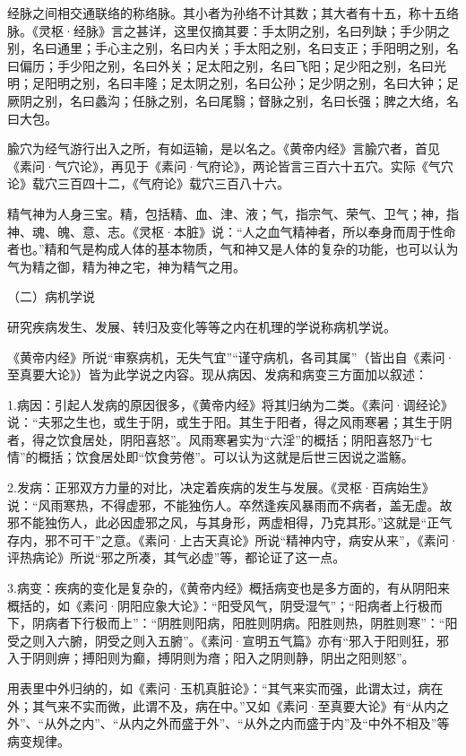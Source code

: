 \documentclass[a4paper,12pt,UTF8,twoside]{ctexbook}
\begin{document}
	经脉之间相交通联络的称络脉。其小者为孙络不计其数；其大者有十五，称十五络脉。《灵枢·经脉》言之甚详，这里仅摘其要：手太阴之别，名曰列缺；手少阴之别，名曰通里；手心主之别，名曰内关；手太阳之别，名曰支正；手阳明之别，名曰偏历；手少阳之别，名曰外关；足太阳之别，名曰飞阳；足少阳之别，名曰光明；足阳明之别，名曰丰隆；足太阴之别，名曰公孙；足少阴之别，名曰大钟；足厥阴之别，名曰蠡沟；任脉之别，名曰尾翳；督脉之别，名曰长强；脾之大络，名曰大包。
	
	腧穴为经气游行出入之所，有如运输，是以名之。《黄帝内经》言腧穴者，首见《素问·气穴论》，再见于《素问·气府论》，两论皆言三百六十五穴。实际《气穴论》载穴三百四十二，《气府论》载穴三百八十六。
	
	精气神为人身三宝。精，包括精、血、津、液；气，指宗气、荣气、卫气；神，指神、魂、魄、意、志。《灵枢·本脏》说：“人之血气精神者，所以奉身而周于性命者也。”精和气是构成人体的基本物质，气和神又是人体的复杂的功能，也可以认为气为精之御，精为神之宅，神为精气之用。
	
	（二）病机学说
	
	研究疾病发生、发展、转归及变化等等之内在机理的学说称病机学说。
	
	《黄帝内经》所说“审察病机，无失气宜”“谨守病机，各司其属”（皆出自《素问·至真要大论》）皆为此学说之内容。现从病因、发病和病变三方面加以叙述：
	
	1.病因：引起人发病的原因很多，《黄帝内经》将其归纳为二类。《素问·调经论》说：“夫邪之生也，或生于阴，或生于阳。其生于阳者，得之风雨寒暑；其生于阴者，得之饮食居处，阴阳喜怒”。风雨寒暑实为“六淫”的概括；阴阳喜怒乃“七情”的概括；饮食居处即“饮食劳倦”。可以认为这就是后世三因说之滥觞。
	
	2.发病：正邪双方力量的对比，决定着疾病的发生与发展。《灵枢·百病始生》说：“风雨寒热，不得虚邪，不能独伤人。卒然逢疾风暴雨而不病者，盖无虚。故邪不能独伤人，此必因虚邪之风，与其身形，两虚相得，乃克其形。”这就是“正气存内，邪不可干”之意。《素问·上古天真论》所说“精神内守，病安从来”，《素问·评热病论》所说“邪之所凑，其气必虚”等，都论证了这一点。
	
	3.病变：疾病的变化是复杂的，《黄帝内经》概括病变也是多方面的，有从阴阳来概括的，如《素问·阴阳应象大论》：“阳受风气，阴受湿气”；“阳病者上行极而下，阴病者下行极而上”：“阴胜则阳病，阳胜则阴病。阳胜则热，阴胜则寒”：“阳受之则入六腑，阴受之则入五腑”。《素问·宣明五气篇》亦有“邪入于阳则狂，邪入于阴则痹；搏阳则为癫，搏阴则为瘖；阳入之阴则静，阴出之阳则怒”。
	
	用表里中外归纳的，如《素问·玉机真脏论》：“其气来实而强，此谓太过，病在外；其气来不实而微，此谓不及，病在中。”又如《素问·至真要大论》有“从内之外”、“从外之内”、“从内之外而盛于外”、“从外之内而盛于内”及“中外不相及”等病变规律。
	
\end{document}

